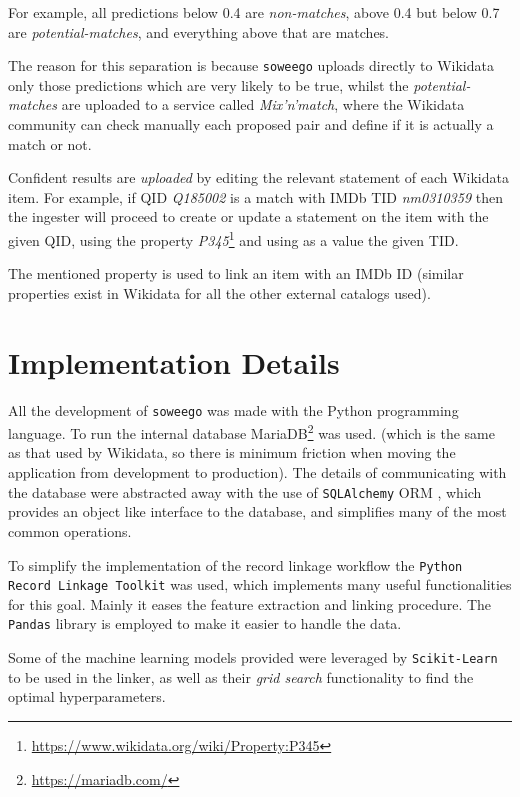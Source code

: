 \documentclass[epsfig,a4paper,11pt,titlepage,twoside,openany]{book}
\newcommand{\footurl}[1]{\footnote{\url{#1}}}
\begin{document}
For example, all predictions below 0.4 are \textit{non-matches}, above 0.4 but below 0.7 are \textit{potential-matches}, and everything above that are matches. 

The reason for this separation is because \texttt{soweego} uploads directly to Wikidata only those predictions which are very likely to be true, whilst the \textit{potential-matches} are uploaded to a service called \textit{Mix'n'match}, where the Wikidata community can check manually each proposed pair and define if it is actually a match or not.

Confident results are \textit{uploaded} by editing the relevant statement of each Wikidata item. For example, if QID \textit{Q185002} is a match with IMDb TID \textit{nm0310359} then the ingester will proceed to create or update a statement on the item with the given QID, using the property \textit{P345}\footurl{https://www.wikidata.org/wiki/Property:P345} and using as a value the given TID. 

The mentioned property is used to link an item with an IMDb ID (similar properties exist in Wikidata for all the other external catalogs used).


\section{Implementation Details}
\label{sec:soweego-implementation-details}

All the development of \texttt{soweego} was made with the Python \cite{python-tutorial} programming language. To run the internal database  MariaDB\footurl{https://mariadb.com/} was used. (which is the same as that used by Wikidata, so there is minimum friction when moving the application from development to production). 
The details of communicating with the database were abstracted away with the use of \texttt{SQLAlchemy} ORM \cite{sqlalchemy}, which provides an object like interface to the database, and simplifies many of the most common operations.

To simplify the implementation of the record linkage workflow the \texttt{Python Record Linkage Toolkit} \cite{recordlinkage-library} was used, which implements many useful functionalities for this goal. Mainly it eases the feature extraction and linking procedure. The \texttt{Pandas} \cite{mckinney2010_pandas} library is employed to make it easier to handle the data.

Some of the machine learning models provided were leveraged by \texttt{Scikit-Learn} \cite{scikit-learn} to be used in the linker, as well as their \textit{grid search} functionality to find the optimal hyperparameters.
\end{document}
